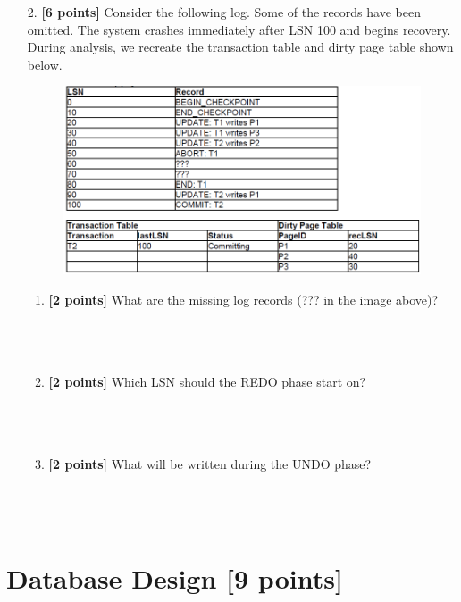\documentclass[10pt]{article}
\begin{document}
\begin{enumerate}
    \item[2.] \textbf{[6 points]} Consider the following log.
        Some of the records have been omitted.
        The system crashes immediately after LSN 100 and begins recovery.
        During analysis, we recreate the transaction table and dirty page table shown below.
        \begin{figure}[ht]
            \centering
            \includegraphics[width=0.9\linewidth]{recovery}
        \end{figure}
        \begin{enumerate}
            \item\textbf{[2 points]} What are the missing log records (??? in the image above)?  \\ \\ \\ \\
            \item\textbf{[2 points]} Which LSN should the REDO phase start on? \\ \\ \\ \\
            \item\textbf{[2 points]} What will be written during the UNDO phase? \\ \\ \\ \\
        \end{enumerate}
\end{enumerate}




\newpage
\section{Database Design \textbf[9 points]}
\end{document}
